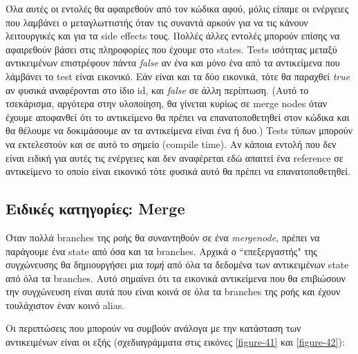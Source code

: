 Όλα αυτές οι εντολές θα αφαιρεθούν από τον κώδικα αφού, μόλις είπαμε οι
ενέργειες που λαμβάνει ο μεταγλωττιστής όταν τις συναντά αρκούν για να τις
κάνουν λειτουργικές και για τα side effects τους. Πολλές άλλες εντολές μπορούν
επίσης να αφαιρεθούν βάσει στις πληροφορίες που έχουμε στο states. Tests
ισότητας μεταξύ αντικειμένων επιστρέφουν πάντα \textit{false} αν ένα και μόνο
ένα από τα αντικείμενα που λάμβάνει το test είναι εικονικό. Εάν είναι και τα δύο
εικονικά, τότε θα παραχθεί \textit{true} αν φυσικά αναφέρονται στο ίδιο id, και
\textit{false} σε άλλη περίπτωση. (Αυτό το τσεκάρισμα, αργότερα στην υλοποίηση,
θα γίνεται κυρίως σε merge nodes όταν έχουμε αποφανθεί ότι το αντικείμενο θα
πρέπει να επανατοποθετηθεί στον κώδικα και θα θέλουμε να δοκιμάσουμε αν τα
αντικείμενα είναι ένα ή δυο.) Tests τύπων μπορούν να εκτελεστούν και σε αυτό το
σημείο (compile time). Αν κάποια εντολή που δεν είναι ειδική για αυτές τις
ενέργειες και δεν αναφέρεται εδώ απαιτεί ένα reference σε αντικείμενο το οποίο
είναι εικονικό τότε φυσικά αυτό θα πρέπει να επανατοποθετηθεί.


\subsection{Ειδικές κατηγορίες: Merge}

Όταν πολλά branches της ροής θα συναντηθούν σε ένα \textit{mergenode}, πρέπει να
παράγουμε ένα state από όσα και τα branches. Αρχικά ο ``επεξεργαστής" της
συγχώνευσης θα δημιουργήσει μια \textit{τομή} από όλα τα δεδομένα των
αντικειμένων state από όλα τα branches. Αυτό σημαίνει ότι τα εικονικά
αντικείμενα που θα επιβιώσουν την συγχώνευση είναι αυτά που είναι κοινά σε όλα
τα branches της ροής και έχουν τουλάχιστον έναν κοινό alias.

Οι περιπτώσεις που μπορούν να συμβούν ανάλογα με την κατάσταση των αντικειμένων
είναι οι εξής (σχεδιαγράμματα στις εικόνες \ref{figure-41} και \ref{figure-42}):

